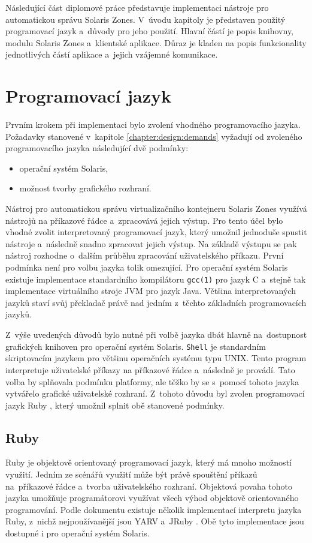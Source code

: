 Následující část diplomové práce představuje implementaci nástroje pro automatickou správu Solaris Zones. V~úvodu
kapitoly je představen použitý programovací jazyk a~důvody pro jeho použití. Hlavní částí
je popis knihovny, modulu Solaris Zones a~klientské aplikace. Důraz je kladen na popis funkcionality jednotlivých 
částí aplikace a~jejich vzájemné komunikace.
\section{Programovací jazyk}
\label{chapter:implementation:language}
Prvním krokem  při implementaci bylo zvolení vhodného programovacího jazyka. Požadavky stanovené v~kapitole 
\ref{chapter:design:demands} vyžadují od zvoleného programovacího jazyka následující dvě podmínky:
\begin{itemize}
 \item operační systém Solaris,
 \item možnost tvorby grafického rozhraní.
\end{itemize}
Nástroj pro automatickou správu virtualizačního kontejneru Solaris Zones využívá
nástrojů na příkazové řádce a~zpracovává jejich výstup. Pro tento účel bylo vhodné zvolit interpretovaný
programovací jazyk, který umožnil jednoduše spustit nástroje a~následně snadno zpracovat jejich výstup. Na základě
výstupu se pak nástroj rozhodne o~dalším průběhu zpracování uživatelského příkazu. První podmínka není pro volbu jazyka
tolik omezující. Pro operační systém Solaris existuje implementace standardního kompilátoru \verb|gcc(1)|
pro jazyk C a~stejně tak implementace virtuálního stroje JVM pro jazyk Java. Většina interpretovaných jazyků
staví svůj překladač právě nad jedním z~těchto základních programovacích jazyků.

Z~výše uvedených důvodů bylo nutné při volbě jazyka dbát hlavně na~dostupnost grafických knihoven pro operační systém
Solaris. \verb|Shell| je standardním skriptovacím jazykem pro většinu operačních systému typu UNIX. Tento program
interpretuje uživatelské příkazy na příkazové řádce a~následně je provádí. Tato volba by splňovala podmínku platformy,
ale těžko by se s~pomocí tohoto jazyka vytvářelo grafické uživatelské rozhraní. Z~tohoto důvodu byl zvolen programovací
jazyk Ruby \cite{ruby}, který umožnil splnit obě stanovené podmínky.
\subsection{Ruby}
\label{chapter:implementation:language:ruby}
Ruby je objektově orientovaný programovací jazyk, který má mnoho možností využití. Jedním ze scénářů využití může být
právě spouštění příkazů na~příkazové řádce a~tvorba uživatelského rozhraní. Objektová povaha tohoto jazyka umožňuje
programátorovi využívat všech výhod objektově orientovaného programování. Podle dokumentu \cite{ruby:implementation}
existuje několik implementací interpretu jazyka Ruby, z~nichž nejpoužívanější jsou YARV \cite{ruby:implementation:yarv} 
a~JRuby \cite{ruby:implementation:jruby}. Obě tyto implementace jsou dostupné i pro operační systém Solaris.

